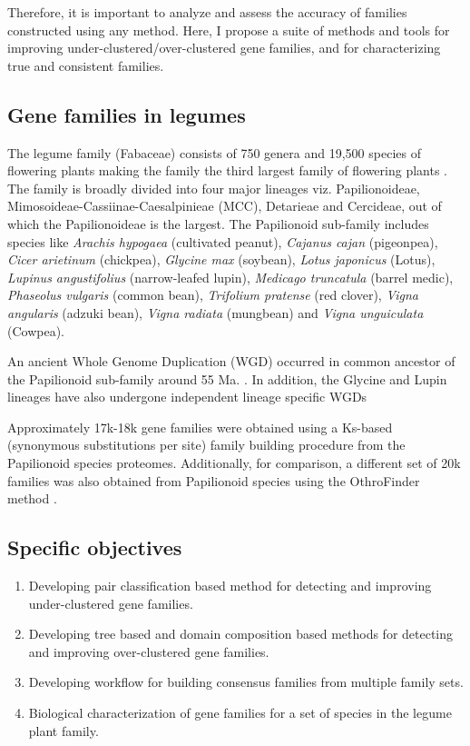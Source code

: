 \documentclass{article}
\begin{document}
		Therefore, it is important to analyze and assess the accuracy of families constructed using any method. Here, I propose a suite of methods and tools for improving under-clustered/over-clustered gene families, and for characterizing true and consistent families.
		
		\subsection{Gene families in legumes}
		The legume family (Fabaceae) consists of 750 genera and 19,500 species of flowering plants making the family the third largest family of flowering plants \citep{lewis2005legumes}. The family is broadly divided into four major lineages viz. Papilionoideae, Mimosoideae-Cassiinae-Caesalpinieae (MCC), Detarieae and Cercideae, out of which the Papilionoideae is the largest. The Papilionoid sub-family includes species like \textit{Arachis hypogaea} (cultivated peanut), \textit{Cajanus cajan} (pigeonpea), \textit{Cicer arietinum} (chickpea), \textit{Glycine max} (soybean), \textit{Lotus japonicus} (Lotus), \textit{Lupinus angustifolius} (narrow-leafed lupin), \textit{Medicago truncatula} (barrel medic), \textit{Phaseolus vulgaris} (common bean), \textit{Trifolium pratense} (red clover), \textit{Vigna angularis} (adzuki bean), \textit{Vigna radiata} (mungbean) and \textit{Vigna unguiculata} (Cowpea).
		
		An ancient Whole Genome Duplication (WGD) occurred in common ancestor of the Papilionoid sub-family around 55 Ma. \citep{blanc2004functional,schlueter2004mining,pfeil2005placing,cannon2006legume,bertioli2009analysis,cannon2014multiple}. In addition, the Glycine and Lupin lineages have also undergone independent lineage specific WGDs \citep{cannon2014multiple,Kroc2014} 
		
		Approximately 17k-18k gene families were obtained using a Ks-based (synonymous substitutions per site) family building procedure from the Papilionoid species proteomes. Additionally, for comparison, a different set of 20k families was also obtained from Papilionoid species using the OthroFinder method \citep{emms2015orthofinder}.
		
		\subsection{Specific objectives}
			\begin{enumerate}
				\item Developing pair classification based method for detecting and improving under-clustered gene families.
				
				\item Developing tree based and domain composition based methods for detecting  and improving over-clustered gene families.
				
				\item Developing workflow for building consensus families from multiple family sets.
				
				\item Biological characterization of gene families for a set of species in the legume plant family.
			\end{enumerate}
		
\end{document}
